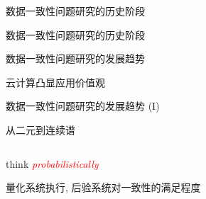 \begin{frame}{数据一致性问题研究的历史阶段}
\end{frame}
\begin{frame}{数据一致性问题研究的历史阶段}
\end{frame}
\begin{frame}{数据一致性问题研究的发展趋势}
  \begin{center}
	云计算凸显应用价值观
  \end{center}

\end{frame}
\begin{frame}{数据一致性问题研究的发展趋势 (I)}
  \begin{description}
	\setlength{\itemsep}{20pt}
	\item[精细化:] 从二元到连续谱
	  \begin{columns}
	  \end{columns}
	  \pause
	\item[可度量:] think \textcolor{red}{\it probabilistically} 
	  \begin{center}
		量化系统执行, 后验系统对一致性的满足程度
	  \end{center}
  \end{description}
\end{frame}
